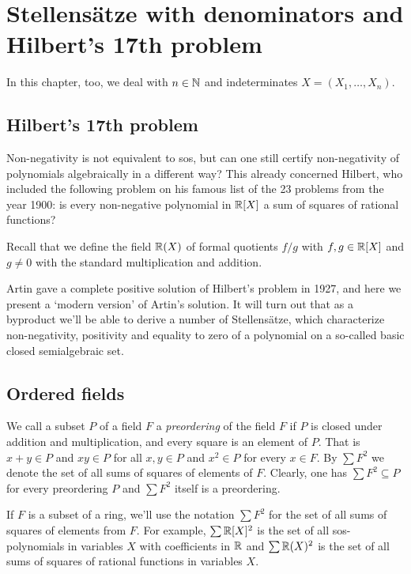 \section{Stellensätze with denominators and Hilbert's 17th problem}

In this chapter, too, we deal with $n \in \mathbb{N}$ and indeterminates $X=(X_1,\ldots,X_n)$.

\subsection{Hilbert's 17th problem}

Non-negativity is not equivalent to sos, but can one still certify non-negativity of polynomials algebraically in a different way? This already concerned Hilbert, who included the following problem on his famous list of the 23 problems from the year 1900: is every non-negative polynomial in $\mathbb{R}[X]$ a sum of squares of rational functions?

Recall that we define the field $\mathbb{R}(X)$ of formal quotients $f / g$ with $f, g \in \mathbb{R}[X]$ and $g \ne 0$ with the standard multiplication and addition. 

Artin gave a complete positive solution of Hilbert's problem in 1927, and here we present a `modern version' of Artin's solution. It will turn out that as a byproduct we'll be able to derive a number of Stellensätze, which characterize non-negativity, positivity and equality to zero of a polynomial on a so-called basic closed semialgebraic set.

\subsection{Ordered fields}

We call a subset $P$ of a field $F$ a \emph{preordering} of the field $F$ if $P$ is closed under addition and multiplication, and every square is an element of $P$. That is $x+y \in P$ and $x y \in P$ for all $x, y \in P$ and $x^2 \in P$ for every $x \in F$. By $\sum F^2$ we denote the set of all sums of squares of elements of $F$. Clearly, one has $\sum F^2 \subseteq P$ for every preordering $P$ and $\sum F^2$ itself is a preordering.

If $F$ is a subset of a ring, we'll use the notation $\sum F^2$ for the set of all sums of squares of elements from $F$. For example, $\sum \mathbb{R}[X]^2$ is the set of all sos-polynomials in variables $X$ with coefficients in $\mathbb{R}$ and $\sum \mathbb{R}(X)^2$ is the set of all sums of squares of rational functions in variables $X$.

